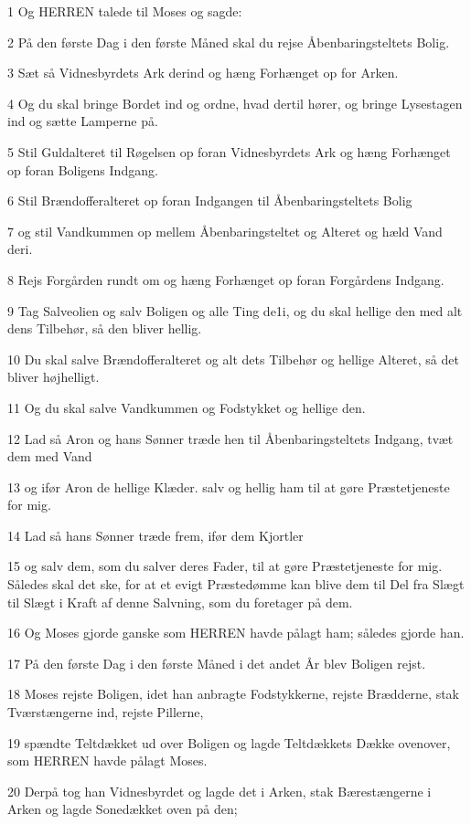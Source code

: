 \par 1 Og HERREN talede til Moses og sagde:
\par 2 På den første Dag i den første Måned skal du rejse Åbenbaringsteltets Bolig.
\par 3 Sæt så Vidnesbyrdets Ark derind og hæng Forhænget op for Arken.
\par 4 Og du skal bringe Bordet ind og ordne, hvad dertil hører, og bringe Lysestagen ind og sætte Lamperne på.
\par 5 Stil Guldalteret til Røgelsen op foran Vidnesbyrdets Ark og hæng Forhænget op foran Boligens Indgang.
\par 6 Stil Brændofferalteret op foran Indgangen til Åbenbaringsteltets Bolig
\par 7 og stil Vandkummen op mellem Åbenbaringsteltet og Alteret og hæld Vand deri.
\par 8 Rejs Forgården rundt om og hæng Forhænget op foran Forgårdens Indgang.
\par 9 Tag Salveolien og salv Boligen og alle Ting de1i, og du skal hellige den med alt dens Tilbehør, så den bliver hellig.
\par 10 Du skal salve Brændofferalteret og alt dets Tilbehør og hellige Alteret, så det bliver højhelligt.
\par 11 Og du skal salve Vandkummen og Fodstykket og hellige den.
\par 12 Lad så Aron og hans Sønner træde hen til Åbenbaringsteltets Indgang, tvæt dem med Vand
\par 13 og ifør Aron de hellige Klæder. salv og hellig ham til at gøre Præstetjeneste for mig.
\par 14 Lad så hans Sønner træde frem, ifør dem Kjortler
\par 15 og salv dem, som du salver deres Fader, til at gøre Præstetjeneste for mig. Således skal det ske, for at et evigt Præstedømme kan blive dem til Del fra Slægt til Slægt i Kraft af denne Salvning, som du foretager på dem.
\par 16 Og Moses gjorde ganske som HERREN havde pålagt ham; således gjorde han.
\par 17 På den første Dag i den første Måned i det andet År blev Boligen rejst.
\par 18 Moses rejste Boligen, idet han anbragte Fodstykkerne, rejste Brædderne, stak Tværstængerne ind, rejste Pillerne,
\par 19 spændte Teltdækket ud over Boligen og lagde Teltdækkets Dække ovenover, som HERREN havde pålagt Moses.
\par 20 Derpå tog han Vidnesbyrdet og lagde det i Arken, stak Bærestængerne i Arken og lagde Sonedækket oven på den;
